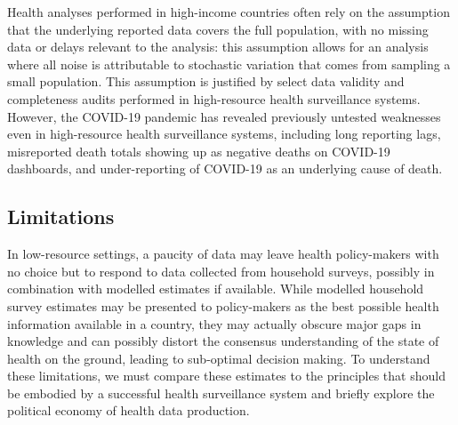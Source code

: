 \documentclass[
]{report}
\begin{document}
Health analyses performed in high-income countries often rely on the assumption that the underlying reported data covers the full population, with no missing data or delays relevant to the analysis: this assumption allows for an analysis where all noise is attributable to stochastic variation that comes from sampling a small population. This assumption is justified by select data validity and completeness audits performed in high-resource health surveillance systems. However, the COVID-19 pandemic has revealed previously untested weaknesses even in high-resource health surveillance systems, including long reporting lags, misreported death totals showing up as negative deaths on COVID-19 dashboards, and under-reporting of COVID-19 as an underlying cause of death\autocite{Weinberger2020a}.

\hypertarget{limitations}{%
\subsection{Limitations}\label{limitations}}

In low-resource settings, a paucity of data may leave health policy-makers with no choice but to respond to data collected from household surveys, possibly in combination with modelled estimates if available. While modelled household survey estimates may be presented to policy-makers as the best possible health information available in a country, they may actually obscure major gaps in knowledge and can possibly distort the consensus understanding of the state of health on the ground, leading to sub-optimal decision making. To understand these limitations, we must compare these estimates to the principles that should be embodied by a successful health surveillance system and briefly explore the political economy of health data production.
\end{document}
